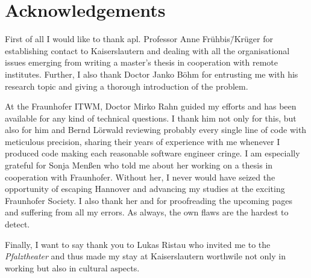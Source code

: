 \chapter*{Acknowledgements}

First of all I would like to thank apl. Professor Anne Frühbis\=/Krüger for establishing contact to Kaiserslautern and dealing with all the organisational issues emerging from writing a master's thesis in cooperation with remote institutes. Further, I also thank Doctor Janko Böhm for entrusting me with his research topic and giving a thorough introduction of the problem.

At the \acl{Fraunhofer ITWM}, Doctor Mirko Rahn guided my efforts and has been available for any kind of technical questions. I thank him not only for this, but also for him and Bernd Lörwald reviewing probably every single line of code with meticulous precision, sharing their years of experience with me whenever I produced code making each reasonable software engineer cringe. I am especially grateful for Sonja Menßen who told me about her working on a thesis in cooperation with Fraunhofer. Without her, I never would have seized the opportunity of escaping Hannover and advancing my studies at the exciting Fraunhofer Society. I also thank her and  for proofreading the upcoming pages and suffering from all my errors. As always, the own flaws are the hardest to detect.

Finally, I want to say thank you to Lukas Ristau who invited me to the \emph{Pfalztheater} and thus made my stay at Kaiserslautern worthwile not only in working but also in cultural aspects.